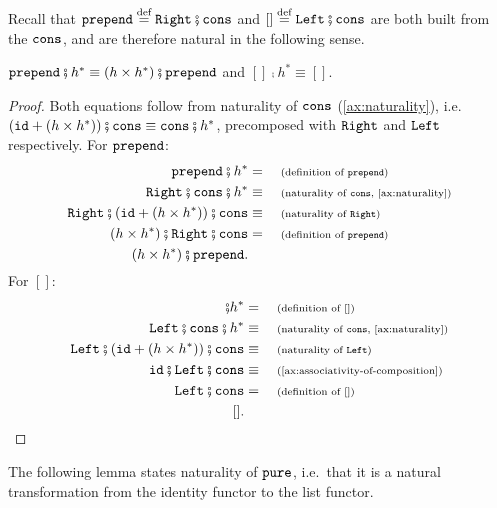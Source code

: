 Recall that $\prependterm \eqdef \rightterm \comp \consterm$ and $[] \eqdef \leftterm \comp \consterm$ are both built from the  $\mathtt{cons}$, and are therefore natural in the following sense.

\begin{lemma}\label{lem:prepend-and-empty-naturality}
    $\prependterm \comp h^* \equiv (h \times h^*) \comp \prependterm$ and $[] \comp h^* \equiv []$.
\end{lemma}
\begin{proof}
    Both equations follow from naturality of $\mathtt{cons}$ (\cref{ax:naturality}), i.e.~$(\idterm + (h \times h^*)) \comp \consterm \equiv \consterm \comp h^*$, precomposed with $\mathtt{Right}$ and $\mathtt{Left}$ respectively. For $\mathtt{prepend}$:
    \begin{align*}
        \prependterm \comp h^* &= \why{definition of $\prependterm$} \\
        \rightterm \comp \consterm \comp h^* \equalbecause{naturality of $\consterm$, \cref{ax:naturality}} \\
        \rightterm \comp (\idterm + (h \times h^*)) \comp \consterm \equalbecause{naturality of $\rightterm$} \\
        (h \times h^*) \comp \rightterm \comp \consterm &= \why{definition of $\prependterm$} \\
        (h \times h^*) \comp \prependterm.
    \end{align*}
    For $[]$:
    \begin{align*}
        [] \comp h^* &= \why{definition of $[]$} \\
        \leftterm \comp \consterm \comp h^* \equalbecause{naturality of $\consterm$, \cref{ax:naturality}} \\
        \leftterm \comp (\idterm + (h \times h^*)) \comp \consterm \equalbecause{naturality of $\leftterm$} \\
        \idterm \comp \leftterm \comp \consterm \equalbecause{\cref{ax:associativity-of-composition}} \\
        \leftterm \comp \consterm &= \why{definition of $[]$} \\
        [].
    \end{align*}
\end{proof}

The following lemma states naturality of $\mathtt{pure}$, i.e.~that it is a natural transformation from the identity functor to the list functor.

